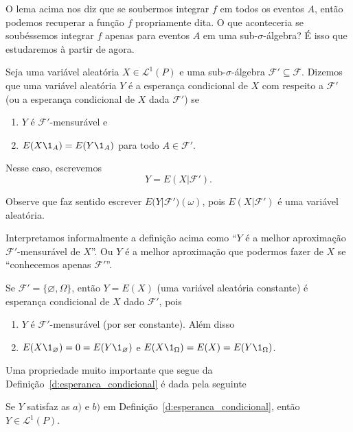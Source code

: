 O lema acima nos diz que se soubermos integrar $f$ em todos os eventos $A$, então podemos recuperar a função $f$ propriamente dita.
O que aconteceria se soubéssemos integrar $f$ apenas para eventos $A$ em uma sub-$\sigma$-álgebra?
É isso que estudaremos à partir de agora.

\begin{definition}
  \label{d:esperanca_condicional}
  Seja uma variável aleatória $X \in \mathcal{L}^1(P)$ e uma sub-$\sigma$-álgebra $\mathcal{F}' \subseteq \mathcal{F}$.
  Dizemos que uma variável aleatória $Y$ é a esperança condicional  de $X$ com respeito a $\mathcal{F}'$ (ou a esperança condicional de $X$ dada $\mathcal{F}'$) se
  \begin{enumerate}[\quad a)]
  \item $Y$ é $\mathcal{F}'$-mensurável e
  \item $E(X \1_{A}) = E(Y \1_{A})$ para todo $A \in \mathcal{F}'$.
  \end{enumerate}
  Nesse caso, escrevemos
  \begin{equation}
    Y = E(X | \mathcal{F}').
  \end{equation}
\end{definition}

Observe que faz sentido escrever $E\big(Y|\mathcal{F}'\big)(\omega)$, pois $E(X|\mathcal{F}')$ é uma variável aleatória.

Interpretamos informalmente a definição acima como ``$Y$ é a melhor aproximação $\mathcal{F}'$-mensurável de $X$''.
Ou $Y$ é a melhor aproximação que podermos fazer de $X$ se ``conhecemos apenas $\mathcal{F}'$''.

\begin{example}
  \label{x:EXF_trivial}
  Se $\mathcal{F}' = \{\varnothing, \Omega\}$, então $Y = E(X)$ (uma variável aleatória constante) é esperança condicional de $X$ dado $\mathcal{F}'$, pois
  \begin{enumerate}[\quad a)]
  \item $Y$ é $\mathcal{F}'$-mensurável (por ser constante). Além disso
  \item $E(X \1_\varnothing) = 0 = E(Y \1_\varnothing)$ e $E(X \1_\Omega) = E(X) = E(Y \1_\Omega)$.
  \end{enumerate}
\end{example}

Uma propriedade muito importante que segue da Definição~\ref{d:esperanca_condicional} é dada pela seguinte

\begin{proposition}
  \label{p:ec_em_L1}
  Se $Y$ satisfaz as $a)$ e $b)$ em Definição~\ref{d:esperanca_condicional}, então $Y \in \mathcal{L}^1(P)$.
\end{proposition}

